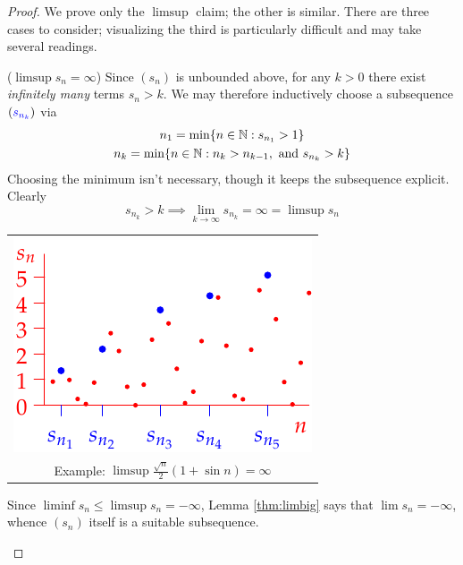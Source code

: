 \begin{proof}
	We prove only the $\limsup$ claim; the other is similar. There are three cases to consider; visualizing the third is particularly difficult and may take several readings.
	\begin{description}
	  \begin{minipage}[t]{0.56\linewidth}\vspace{-10pt}
		  \item[\normalfont ($\limsup s_n=\infty$)]\lstsp Since $(s_n)$ is unbounded above, for any $k>0$ there exist \emph{infinitely many} terms $s_n>k$. We may therefore inductively choose a subsequence $(\textcolor{blue}{s_{n_k}})$ via
		  \begin{gather*}
		  	n_1=\min\{n\in\mathbb{N}:s_{n_1}>1\}\\
		  	n_k=\min\{n\in\mathbb{N}:n_k>n_{k-1},\text{ and } s_{n_k}>k\}
		  \end{gather*}
		  Choosing the minimum isn't necessary, though it keeps the subsequence explicit. Clearly
			\[
				s_{n_k}>k\implies \lim_{k\to\infty} s_{n_k}=\infty=\limsup s_n
			\]
	  \end{minipage}
	 	\hfill
	 	\begin{minipage}[t]{0.4\linewidth}\vspace{-10pt}
		  \hfill
		  \begin{tabular}{c@{}}
		  	\includegraphics[scale=0.95]{dominant3}\\
		  	Example: $\limsup \frac{\sqrt n}2(1+\sin n)=\infty$
		  \end{tabular}
	  \end{minipage}
	  
		\item[\normalfont ($\limsup s_n=-\infty$)]\lstsp Since $\liminf s_n\le \limsup s_n=-\infty$, Lemma \ref{thm:limbig} says that $\lim s_n=-\infty$, whence $(s_n)$ itself is a suitable subsequence.
		

\end{description}
\end{proof}

